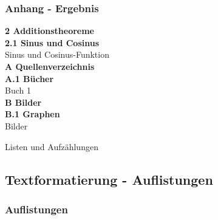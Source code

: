 \documentclass{beamer}
\begin{document}
\begin{frame}
\frametitle{Anhang - Ergebnis}
  \Large \textbf{2 Additionstheoreme} \\
  \vspace{1ex}
  \large \textbf{2.1 Sinus und Cosinus} \\
  \vspace{1ex}
  \normalsize Sinus und Cosinus-Funktion \\
  \vspace{2ex}
  \Large \textbf{A Quellenverzeichnis}\\
  \vspace{1ex}
  \large \textbf{A.1 Bücher} \\
  \vspace{1ex}
  \normalsize Buch 1 \\
  \vspace{2ex}
  \Large \textbf{B Bilder} \\
  \vspace{1ex}
  \large \textbf{B.1 Graphen} \\
  \vspace{1ex}
  \normalsize Bilder
\end{frame}


\begin{frame}
 \begin{center}
  \Huge Listen und Aufzählungen
 \end{center}
\end{frame}

\subsection{Textformatierung - Auflistungen}
\begin{frame}[fragile]
\frametitle{Auflistungen}
  \begin{semiverbatim}
  \end{semiverbatim}
\end{frame}
\end{document}

